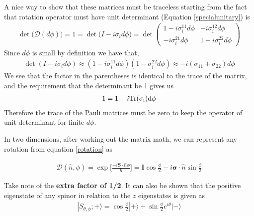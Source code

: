 A nice way to show that these matrices must be traceless starting from the fact that rotation operator must have unit determinant (Equation \ref{specialunitary}) is
\begin{align}
    \det\Big(\mathcal{D}(d\phi)\Big) = 1  = \det\Big(I -i\sigma_i d\phi\Big) = \det
\left(
{\begin{array}{ccc}
1 -i \sigma_i^{11}d\phi&-i\sigma_i^{12}d\phi\\
-i\sigma_i^{21}d\phi&1-i\sigma_i^{22}d\phi
\end{array}}
\right)
\end{align}
Since $d\phi$ is small by definition we have that, 
\begin{align}
    \det(I-i\sigma_id\phi) \approx (1-i\sigma_i^{11}d\phi)(1-\sigma_i^{22}d\phi) \approx -i(\sigma_{11}+\sigma_{22})d\phi
\end{align}
We see that the factor in the parentheses is identical to the trace of the matrix, and the requirement that the determinant be 1 gives us
\begin{align}
    1 = 1  -i\rm{Tr}(\sigma_i)d\phi
\end{align}
Therefore the trace of the Pauli matrices must be zero to keep the operator of unit determinant for finite $d\phi$.


In two dimensions, after working out the matrix math, we can represent any rotation from equation \ref{rotation} as 




\begin{align}
\mathcal{D}(\hat{n},\phi) = \exp\Big[\frac{-i\textbf{S}\cdot\hat{n}\phi}{\hbar}\Big] = \textbf{I}\cos\frac{\phi}{2} -i\boldsymbol{\sigma}\cdot\hat{n}\sin\frac{\phi}{2}
\end{align}

Take note of the \textbf{extra factor of 1/2}. It can also be shown that the positive eigenstate of any spinor in relation to the $z$ eigenstates is given as
\begin{align}
|S_{\theta,\phi}; +\rangle =\cos\frac{\phi}{2}|+\rangle +\sin\frac{\phi}{2}e^{i\theta}|-\rangle
\end{align}



